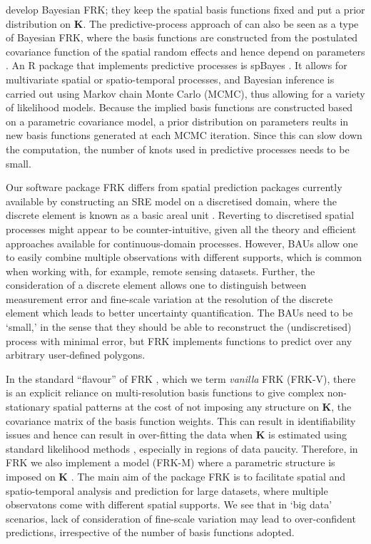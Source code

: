 \documentclass{article}\usepackage[]{graphicx}\usepackage[]{color}
\newcommand{\pkg}[1]{{\fontseries{b}\selectfont #1}}
\let\proglang=\textsf
\newcommand{\Kmat} {\textbf{K}}
\begin{document}
\cite{Kang_2011} develop Bayesian FRK; they keep the spatial basis functions fixed and put a prior distribution on $\Kmat$. The predictive-process approach of \citet{Banerjee_2008} can also be seen as a type of Bayesian FRK, where the basis functions are constructed from the postulated covariance function of the spatial random effects and hence depend on parameters \citep[see][for an equivalence argument]{Katzfuss_2014}. An \proglang{R} package that implements predictive processes is \pkg{spBayes} \citep{Finley_2007}. It allows for multivariate spatial or spatio-temporal processes, and Bayesian inference is carried out using Markov chain Monte Carlo (MCMC), thus allowing for a variety of likelihood models. Because the implied basis functions are constructed based on a parametric covariance model, a prior distribution on parameters reults in new basis functions generated at each MCMC iteration. Since this can slow down the computation, the number of knots used in predictive processes needs to be small.

Our software package \pkg{FRK} differs from spatial prediction packages currently available by constructing an SRE model on a discretised domain, where the discrete element is known as a basic areal unit \citep[BAU; see, e.g.,][]{Nguyen_2012}. Reverting to discretised spatial processes might appear to be counter-intuitive, given all the theory and efficient approaches available for continuous-domain processes. However, BAUs allow one to easily combine multiple observations with different supports, which is common when working with, for example, remote sensing datasets. Further, the consideration of a discrete element allows one to distinguish between measurement error and fine-scale variation at the resolution of the discrete element which leads to better uncertainty quantification. The BAUs need to be `small,' in the sense that they should be able to reconstruct the (undiscretised) process with minimal error, but \pkg{FRK} implements functions to predict over any arbitrary user-defined polygons.

In the standard ``flavour'' of \pkg{FRK} \citep{Cressie_2008}, which we term \emph{vanilla} FRK (FRK-V), there is an explicit reliance on multi-resolution basis functions to give complex non-stationary spatial patterns at the cost of not imposing any structure on $\Kmat$, the covariance matrix of the basis function weights. This can result in identifiability issues and hence can result in over-fitting the data when $\Kmat$ is estimated using standard likelihood methods  \citep[e.g.,][]{Nguyen_2014}, especially in regions of data paucity. Therefore, in \pkg{FRK} we also implement a model (FRK-M) where a parametric structure is imposed on $\Kmat$ \citep[e.g.,][]{Stein_2008,Nychka_2015}. The main aim of the package \pkg{FRK} is to facilitate spatial and spatio-temporal analysis and prediction for large datasets, where multiple observatons come with different spatial supports. We see that in `big data' scenarios, lack of consideration of fine-scale variation may lead to over-confident predictions, irrespective of the number of basis functions adopted.
\end{document}
